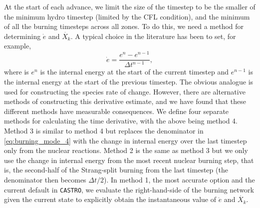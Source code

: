 \documentclass[twocolumn,numberedappendix]{../aastex6}
\newcommand{\castro}{\texttt{CASTRO}}
\begin{document}
At the start of each advance, we limit the size of the timestep to be the smaller
of the minimum hydro timestep (limited by the CFL condition), and the minimum of all the
burning timesteps across all zones. To do this, we need a method for determining 
$\dot{e}$ and $\dot{X_k}$. A typical choice in the literature has been to set, for example,
\begin{equation}
  \dot{e} = \frac{e^{n} - e^{n-1}}{\Delta t^{n-1}}, \label{eq:burning_mode_4}
\end{equation}
where is $e^n$ is the internal energy at the start of the current timestep and
$e^{n-1}$ is the internal energy at the start of the previous timestep. 
The obvious analogue is used for constructing the species rate of change.
However, there are alternative methods of constructing this derivative estimate, 
and we have found that these different methods have measurable consequences.
We define four separate methods for calculating the time derivative, with 
the above being method 4. Method 3 is similar to method 4 but replaces the
denominator in \autoref{eq:burning_mode_4} with the change in 
internal energy over the last timestep only from the nuclear reactions.
Method 2 is the same as method 3 but we only use the change in internal 
energy from the most recent nuclear burning step, that is, the second-half
of the Strang-split burning from the last timestep (the denominator 
then becomes $\Delta t / 2$). In method 1, the most accurate option and 
the current default in \castro, we evaluate the right-hand-side of the 
burning network given the current state to explicitly obtain the 
instantaneous value of $\dot{e}$ and $\dot{X_k}$. 
\end{document}

